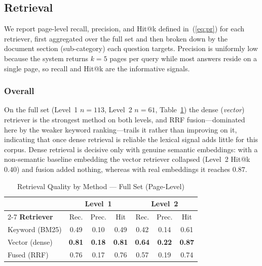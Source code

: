 \documentclass[10pt,a4paper,conference]{IEEEtran}
\begin{document}
\subsection{Retrieval}
We report page-level recall, precision, and Hit@k defined in~(\ref{eq:pr}) for
each retriever, first aggregated over the full set and then broken down by the
document section (sub-category) each question targets. Precision is uniformly low
because the system returns $k=5$ pages per query while most answers reside on a
single page, so recall and Hit@k are the informative signals.

\subsubsection{Overall}
On the full set (Level~1 $n=113$, Level~2 $n=61$, Table~\ref{tab:retr}) the dense
(\emph{vector}) retriever is the strongest method on both levels, and RRF
fusion---dominated here by the weaker keyword ranking---trails it rather than
improving on it, indicating that once dense retrieval is reliable the lexical
signal adds little for this corpus. Dense retrieval is decisive only with genuine
semantic embeddings: with a non-semantic baseline embedding the vector retriever
collapsed (Level~2 Hit@k $0.40$) and fusion added nothing, whereas with real
embeddings it reaches $0.87$.

\begin{table}[htbp]
\caption{Retrieval Quality by Method --- Full Set (Page-Level)}
\begin{center}
\footnotesize
\begin{tabular}{|l|ccc|ccc|}
\hline
 & \multicolumn{3}{c|}{\textbf{Level~1}} & \multicolumn{3}{c|}{\textbf{Level~2}} \\
\cline{2-7}
\textbf{Retriever} & Rec. & Prec. & Hit & Rec. & Prec. & Hit \\
\hline
Keyword (BM25) & 0.49 & 0.10 & 0.49 & 0.42 & 0.14 & 0.61 \\
\hline
Vector (dense) & \textbf{0.81} & \textbf{0.18} & \textbf{0.81} & \textbf{0.64} & \textbf{0.22} & \textbf{0.87} \\
\hline
Fused (RRF) & 0.76 & 0.17 & 0.76 & 0.57 & 0.19 & 0.74 \\
\hline
\end{tabular}
\label{tab:retr}
\end{center}
\end{table}
\end{document}
